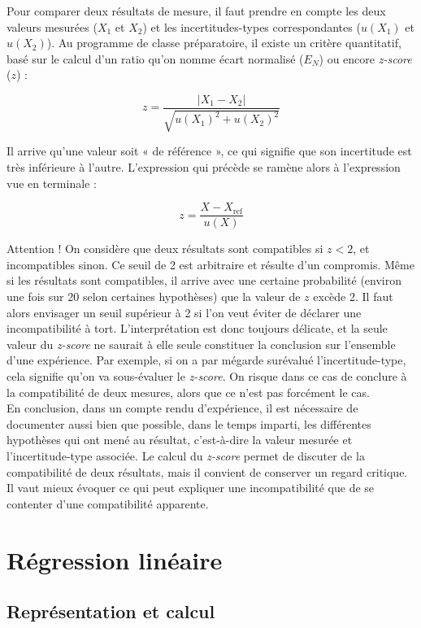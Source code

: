 \documentclass[10pt]{article}
\begin{document}
\begin{multicols}{2}
Pour comparer deux résultats de mesure, il faut prendre en compte les deux valeurs mesurées ($X_1$ et $X_2$) et les incertitudes-types correspondantes ($u(X_1)$ et $u(X_2)$). Au programme de classe préparatoire, il existe un critère quantitatif, basé sur le calcul d’un ratio qu’on nomme écart normalisé ($E_N$) ou encore \textit{z-score} ($z$) :

\[
z = \frac{|X_1 - X_2|}{\sqrt{u(X_1)^2 + u(X_2)^2}}
\]

Il arrive qu’une valeur soit « de référence », ce qui signifie que son incertitude est très inférieure à l’autre. L’expression qui précède se ramène alors à l’expression vue en terminale :

\[
z = \frac{X - X_\text{ref}}{u(X)}
\]

Attention ! On considère que deux résultats sont compatibles si $z < 2$, et incompatibles sinon. Ce seuil de 2 est arbitraire et résulte d’un compromis. Même si les résultats sont compatibles, il arrive avec une certaine probabilité (environ une fois sur 20 selon certaines hypothèses) que la valeur de $z$ excède 2. Il faut alors envisager un seuil supérieur à 2 si l’on veut éviter de déclarer une incompatibilité à tort. L’interprétation est donc toujours délicate, et la seule valeur du \textit{z-score} ne saurait à elle seule constituer la conclusion sur l’ensemble d’une expérience. Par exemple, si on a par mégarde surévalué l’incertitude-type, cela signifie qu’on va sous-évaluer le \textit{z-score}. On risque dans ce cas de conclure à la compatibilité de deux mesures, alors que ce n’est pas forcément le cas. \\

En conclusion, dans un compte rendu d’expérience, il est nécessaire de documenter aussi bien que possible, dans le temps imparti, les différentes hypothèses qui ont mené au résultat, c’est-à-dire la valeur mesurée et l’incertitude-type associée. Le calcul du \textit{z-score} permet de discuter de la compatibilité de deux résultats, mais il convient de conserver un regard critique. Il vaut mieux évoquer ce qui peut expliquer une incompatibilité que de se contenter d’une compatibilité apparente.

\section{Régression linéaire}

\subsection{Représentation et calcul}


\end{multicols}
\end{document}
